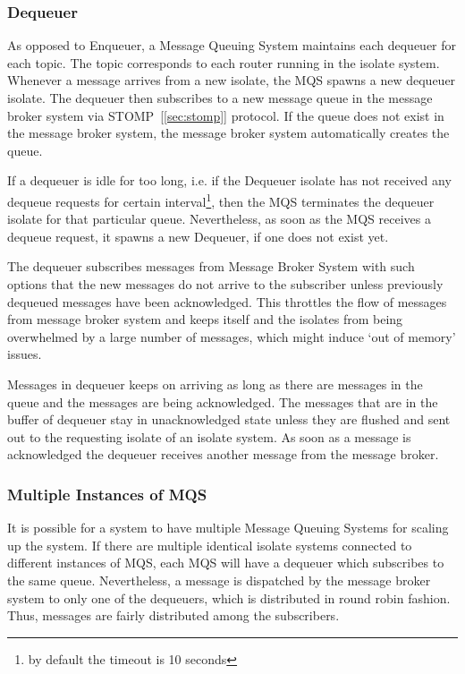   \subsubsection{Dequeuer}
  As opposed to Enqueuer, a Message Queuing System maintains each dequeuer for each topic. The topic corresponds to each router running in the isolate system. Whenever a message arrives from a new isolate, the MQS spawns a new dequeuer isolate. The dequeuer then subscribes to a new message queue in the message broker system via STOMP~[\ref{sec:stomp}] protocol. If the queue does not exist in the message broker system, the message broker system automatically creates the queue.

  If a dequeuer is idle for too long, i.e. if the Dequeuer isolate has not received any dequeue requests for certain interval\footnote{by default the timeout is 10 seconds}, then the MQS terminates the dequeuer isolate for that particular queue. Nevertheless, as soon as the MQS receives a dequeue request, it spawns a new Dequeuer, if one does not exist yet.

  The dequeuer subscribes messages from Message Broker System with such options that the new messages do not arrive to the subscriber unless previously dequeued messages have been acknowledged. This throttles the flow of messages from message broker system and keeps itself and the isolates from being overwhelmed by a large number of messages, which might induce ‘out of memory’ issues.

  Messages in dequeuer keeps on arriving as long as there are messages in the queue and the messages are being acknowledged. The messages that are in the buffer of dequeuer stay in unacknowledged state unless they are flushed and sent out to the requesting isolate of an isolate system. As soon as a message is acknowledged the dequeuer receives another message from the message broker.

  \subsubsection{Multiple Instances of MQS}
  It is possible for a system to have multiple Message Queuing Systems for scaling up the system. If there are multiple identical isolate systems connected to different instances of MQS, each MQS will have a dequeuer which subscribes to the same queue. Nevertheless, a message is dispatched by the message broker system to only one of the dequeuers, which is distributed in round robin fashion. Thus, messages are fairly distributed among the subscribers.

